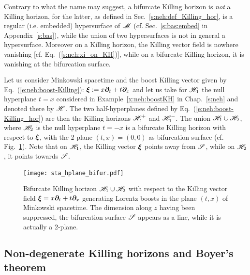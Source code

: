 \begin{remark}
Contrary to what the name may suggest, a bifurcate Killing horizon is \emph{not}
a Killing horizon, for the latter, as defined in Sec.~\ref{s:neh:def_Killing_hor},
is a regular (i.e. embedded) hypersurface
of $\mathscr{M}$ (cf. Sec.~\ref{s:bas:embed} in Appendix~\ref{s:bas}), while
the union of two hypersurfaces is not in general a hypersurface. Moreover
on a Killing horizon, the Killing vector field is nowhere vanishing
[cf. Eq.~(\ref{s:neh:xi_on_KH})], while on
a bifurcate Killing horizon, it is vanishing at the bifurcation surface.
\end{remark}

\begin{example}
\label{x:sta:bif-KH-boost}
Let us consider Minkowski spacetime and the boost Killing vector given
by Eq.~(\ref{e:neh:boost-Killing}): $\bm{\xi} := x \bm{\partial}_t + t \bm{\partial}_x$
and let us take for $\mathscr{H}_1$ the null hyperplane $t=x$
considered in Example~\ref{x:neh:boostKH} in Chap.~\ref{s:neh} and denoted there
by $\mathscr{H}$. The two half-hyperplanes defined by
Eq.~(\ref{e:neh:boost-Killing_hor}) are then the Killing horizons $\mathscr{H}_1^+$ and
$\mathscr{H}_1^-$. The union $\mathscr{H}_1 \cup \mathscr{H}_2$, where $\mathscr{H}_2$ is the null hyperplane $t=-x$ is a bifurcate Killing horizon with respect to $\bm{\xi}$,
with the 2-plane $(t,x)=(0,0)$ as bifurcation surface
(cf. Fig.~\ref{f:sta:hplane_bifur}). Note that on $\mathscr{H}_1$, the Killing vector
$\bm{\xi}$ points away from $\mathscr{S}$, while on $\mathscr{H}_2$, it points towards $\mathscr{S}$.
\end{example}

\begin{figure}
\centerline{\texttt{[image: sta\_hplane\_bifur.pdf]}}
\caption[]{\label{f:sta:hplane_bifur} \footnotesize
Bifurcate Killing horizon $\mathscr{H}_1\cup\mathscr{H}_2$ with respect to the Killing vector
field $\bm{\xi} = x \bm{\partial}_t + t \bm{\partial}_x$ generating Lorentz boosts in the plane $(t,x)$ of Minkowski spacetime. The dimension along $z$ having been suppressed, the bifurcation
surface $\mathscr{S}$ appears as a line, while it is actually a 2-plane.}
\end{figure}



\subsection{Non-degenerate Killing horizons and Boyer's theorem}
\label{s:sta:non-degenerate_KH}


